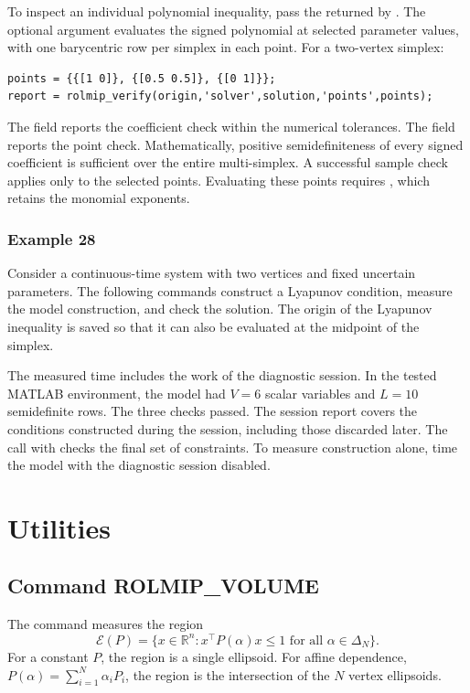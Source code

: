 \documentclass[english,11pt]{article}
\theoremstyle{break} \theorembodyfont{\small\rm}
\begin{document}
To inspect an individual polynomial inequality, pass the 
returned by . The optional  argument
evaluates the signed polynomial at selected parameter values, with one
barycentric row per simplex in each point. For a two-vertex simplex:
\begin{lstlisting}
points = {{[1 0]}, {[0.5 0.5]}, {[0 1]}};
report = rolmip_verify(origin,'solver',solution,'points',points);
\end{lstlisting}
The field  reports the coefficient check
within the numerical tolerances. The field 
reports the point check. Mathematically, positive semidefiniteness
of every signed coefficient is sufficient over the entire multi-simplex.
A successful sample check applies only to the selected points.
Evaluating these points requires , which retains
the monomial exponents.

\subsubsection*{Example 28}
Consider a continuous-time system with two vertices and fixed uncertain
parameters. The following commands construct a Lyapunov condition,
measure the model construction, and check the solution. The origin of the
Lyapunov inequality is saved so that it can also be evaluated at the
midpoint of the simplex.

The measured time includes the work of the diagnostic session.
In the tested MATLAB environment, the model had $V=6$ scalar variables
and $L=10$ semidefinite rows. The three checks passed. The session report
covers the conditions constructed during the session, including those
discarded later. The call with  checks the final set of
constraints. To measure construction alone, time the model with the
diagnostic session disabled.

\section{Utilities}\label{sec_utilities}

\subsection*{Command ROLMIP\_VOLUME}
The command  measures the region
\[
  \mathcal E(P) = \{x \in \mathbb R^n : x^\top P(\alpha)x \le 1
                      \text{ for all } \alpha \in \Delta_N\}.
\]
For a constant $P$, the region
is a single ellipsoid. For affine dependence,
$P(\alpha)=\sum_{i=1}^{N}\alpha_iP_i$, the region is the intersection of
the $N$ vertex ellipsoids.
\end{document}
